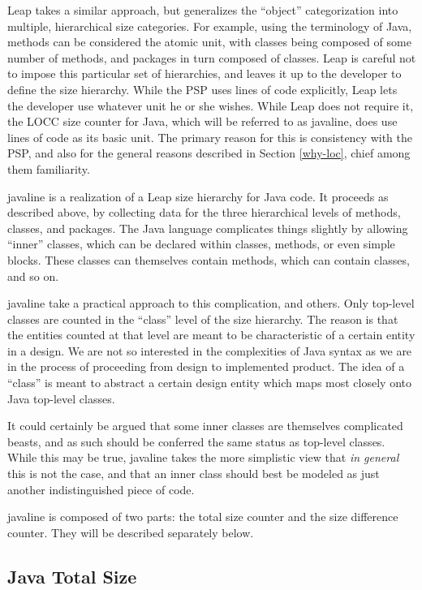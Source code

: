 Leap takes a similar approach, but generalizes the ``object''
categorization into multiple, hierarchical size categories.  For
example, using the terminology of Java, methods can be considered the
atomic unit, with classes being composed of some number of methods,
and packages in turn composed of classes.  Leap is careful not to
impose this particular set of hierarchies, and leaves it up to the
developer to define the size hierarchy.  While the PSP uses lines of
code explicitly, Leap lets the developer use whatever unit he or she
wishes.  While Leap does not require it, the LOCC size
counter for Java, which will be referred to as {\sc javaline}, does use lines of code as its basic unit.  The
primary reason for this is consistency with the PSP, and also for the
general reasons described in Section \ref{why-loc}, chief among them
familiarity. 

{\sc javaline} is a realization of a Leap size hierarchy for Java code.  It
proceeds as described above, by collecting data for the three
hierarchical levels of methods, classes, and packages.  The Java
language complicates things slightly by allowing ``inner'' classes,
which can be declared within classes, methods, or even simple blocks.
These classes can themselves contain methods, which can contain
classes, and so on.  

{\sc javaline} take a practical approach to this complication, and others.  Only 
top-level classes are counted in the ``class'' level of the size
hierarchy.  The reason is that the entities counted at that level are 
meant to be characteristic of a certain entity in a design.
We are not so interested in the complexities of Java syntax as we are
in the process of proceeding from design to implemented product.  The
idea of a ``class'' is meant to abstract a certain design entity which 
maps most closely onto Java top-level classes.  

It could certainly be argued that some inner classes are themselves
complicated beasts, and as such should be conferred the same status as 
top-level classes.  While this may be true, {\sc javaline} takes the more
simplistic view that {\em in general} this is not the case, and that
an inner class should best be modeled as just another indistinguished
piece of code.

{\sc javaline} is composed of two parts: the total size
counter and the size difference counter.  They will be described
separately below.

\subsection{Java Total Size}

